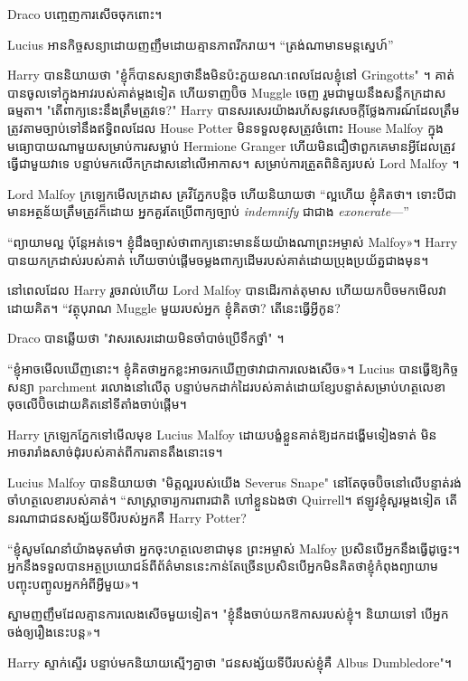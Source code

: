 {{Draco បញ្ចេញ​ការ​សើច​ចុក​ពោះ។

Lucius អានកិច្ចសន្យាដោយញញឹមដោយគ្មានភាពរីករាយ។ “ត្រង់​ណា​មាន​មន្ត​ស្នេហ៍”

Harry បាននិយាយថា "ខ្ញុំក៏បានសន្យាថានឹងមិនប៉ះភួយខណៈពេលដែលខ្ញុំនៅ Gringotts" ។ គាត់បានចូលទៅក្នុងអាវរបស់គាត់ម្តងទៀត ហើយទាញប៊ិច Muggle ចេញ រួមជាមួយនឹងសន្លឹកក្រដាសធម្មតា។ "តើពាក្យនេះនឹងត្រឹមត្រូវទេ?" Harry បានសរសេរយ៉ាងរហ័សនូវសេចក្តីថ្លែងការណ៍ដែលត្រឹមត្រូវតាមច្បាប់ទៅនឹងឥទ្ធិពលដែល House Potter មិនទទួលខុសត្រូវចំពោះ House Malfoy ក្នុងមធ្យោបាយណាមួយសម្រាប់ការសម្លាប់ Hermione Granger ហើយមិនជឿថាពួកគេមានអ្វីដែលត្រូវធ្វើជាមួយវាទេ បន្ទាប់មកលើកក្រដាសនៅលើអាកាស។ សម្រាប់ការត្រួតពិនិត្យរបស់ Lord Malfoy ។

Lord Malfoy ក្រឡេកមើលក្រដាស គ្រវីភ្នែកបន្តិច ហើយនិយាយថា “ល្អហើយ ខ្ញុំគិតថា។ ទោះបីជាមានអត្ថន័យត្រឹមត្រូវក៏ដោយ អ្នកគួរតែប្រើពាក្យច្បាប់ \emph{indemnify} ជាជាង \emph{exonerate}—”

“ព្យាយាមល្អ ប៉ុន្តែអត់ទេ។ ខ្ញុំ​ដឹង​ច្បាស់​ថា​ពាក្យ​នោះ​មាន​ន័យ​យ៉ាង​ណា​ព្រះអម្ចាស់ Malfoy»។ Harry បានយកក្រដាស់របស់គាត់ ហើយចាប់ផ្តើមចម្លងពាក្យដើមរបស់គាត់ដោយប្រុងប្រយ័ត្នជាងមុន។

នៅពេលដែល Harry រួចរាល់ហើយ Lord Malfoy បានដើរកាត់តុមាស ហើយយកប៊ិចមកមើលវាដោយគិត។ “វត្ថុបុរាណ Muggle មួយរបស់អ្នក ខ្ញុំគិតថា? តើនេះធ្វើអ្វីកូន?

Draco បានឆ្លើយថា "វាសរសេរដោយមិនចាំបាច់ប្រើទឹកថ្នាំ" ។

“ខ្ញុំ​អាច​មើល​ឃើញ​នោះ។ ខ្ញុំ​គិត​ថា​អ្នក​ខ្លះ​អាច​រក​ឃើញ​ថា​វា​ជា​ការ​លេង​សើច»។ Lucius បានធ្វើឱ្យកិច្ចសន្យា parchment រលោងនៅលើតុ បន្ទាប់មកដាក់ដៃរបស់គាត់ដោយខ្សែបន្ទាត់សម្រាប់ហត្ថលេខា ចុចលើប៊ិចដោយគិតនៅទីតាំងចាប់ផ្តើម។

Harry ក្រឡេកភ្នែកទៅមើលមុខ Lucius Malfoy ដោយបង្ខំខ្លួនគាត់ឱ្យដកដង្ហើមទៀងទាត់ មិនអាចរារាំងសាច់ដុំរបស់គាត់ពីការតានតឹងនោះទេ។

Lucius Malfoy បាននិយាយថា "មិត្តល្អរបស់យើង Severus Snape" នៅតែចុចប៊ិចនៅលើបន្ទាត់រង់ចាំហត្ថលេខារបស់គាត់។ “សាស្ត្រាចារ្យការពារជាតិ ហៅខ្លួនឯងថា Quirrell។ ឥឡូវ​ខ្ញុំ​សួរ​ម្ដង​ទៀត តើ​នរណា​ជា​ជន​សង្ស័យ​ទី​បី​របស់​អ្នក​គឺ Harry Potter?

“ខ្ញុំសូមណែនាំយ៉ាងមុតមាំថា អ្នកចុះហត្ថលេខាជាមុន ព្រះអម្ចាស់ Malfoy ប្រសិនបើអ្នកនឹងធ្វើដូច្នេះ។ អ្នក​នឹង​ទទួល​បាន​អត្ថប្រយោជន៍​ពី​ព័ត៌មាន​នេះ​កាន់​តែ​ច្រើន​ប្រសិន​បើ​អ្នក​មិន​គិត​ថា​ខ្ញុំ​កំពុង​ព្យាយាម​បញ្ចុះបញ្ចូល​អ្នក​អំពី​អ្វី​មួយ»។

ស្នាមញញឹមដែលគ្មានការលេងសើចមួយទៀត។ "ខ្ញុំនឹងចាប់យកឱកាសរបស់ខ្ញុំ។ និយាយ​ទៅ បើ​អ្នក​ចង់​ឲ្យ​រឿង​នេះ​បន្ត»។

Harry ស្ទាក់ស្ទើរ បន្ទាប់មកនិយាយស្មើៗគ្នាថា "ជនសង្ស័យទីបីរបស់ខ្ញុំគឺ Albus Dumbledore"។

}}
